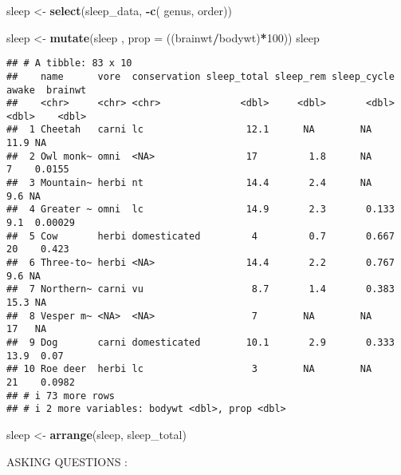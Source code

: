 \documentclass[
]{article}
\newenvironment{Shaded}{\begin{snugshade}}{\end{snugshade}}
\newcommand{\AttributeTok}[1]{\textcolor[rgb]{0.13,0.29,0.53}{#1}}
\newcommand{\DecValTok}[1]{\textcolor[rgb]{0.00,0.00,0.81}{#1}}
\newcommand{\FunctionTok}[1]{\textcolor[rgb]{0.13,0.29,0.53}{\textbf{#1}}}
\newcommand{\NormalTok}[1]{#1}
\newcommand{\OtherTok}[1]{\textcolor[rgb]{0.56,0.35,0.01}{#1}}
\newcommand{\SpecialCharTok}[1]{\textcolor[rgb]{0.81,0.36,0.00}{\textbf{#1}}}
\begin{document}
\begin{Shaded}
\begin{Highlighting}[]
\NormalTok{sleep }\OtherTok{\textless{}{-}} \FunctionTok{select}\NormalTok{(sleep\_data, }\SpecialCharTok{{-}}\FunctionTok{c}\NormalTok{( genus, order))}
\end{Highlighting}
\end{Shaded}

\begin{Shaded}
\begin{Highlighting}[]
\NormalTok{sleep }\OtherTok{\textless{}{-}} \FunctionTok{mutate}\NormalTok{(sleep , }\AttributeTok{prop =}\NormalTok{ ((brainwt}\SpecialCharTok{/}\NormalTok{bodywt)}\SpecialCharTok{*}\DecValTok{100}\NormalTok{))}
\NormalTok{sleep}
\end{Highlighting}
\end{Shaded}

\begin{verbatim}
## # A tibble: 83 x 10
##    name      vore  conservation sleep_total sleep_rem sleep_cycle awake  brainwt
##    <chr>     <chr> <chr>              <dbl>     <dbl>       <dbl> <dbl>    <dbl>
##  1 Cheetah   carni lc                  12.1      NA        NA      11.9 NA      
##  2 Owl monk~ omni  <NA>                17         1.8      NA       7    0.0155 
##  3 Mountain~ herbi nt                  14.4       2.4      NA       9.6 NA      
##  4 Greater ~ omni  lc                  14.9       2.3       0.133   9.1  0.00029
##  5 Cow       herbi domesticated         4         0.7       0.667  20    0.423  
##  6 Three-to~ herbi <NA>                14.4       2.2       0.767   9.6 NA      
##  7 Northern~ carni vu                   8.7       1.4       0.383  15.3 NA      
##  8 Vesper m~ <NA>  <NA>                 7        NA        NA      17   NA      
##  9 Dog       carni domesticated        10.1       2.9       0.333  13.9  0.07   
## 10 Roe deer  herbi lc                   3        NA        NA      21    0.0982 
## # i 73 more rows
## # i 2 more variables: bodywt <dbl>, prop <dbl>
\end{verbatim}

\begin{Shaded}
\begin{Highlighting}[]
\NormalTok{sleep }\OtherTok{\textless{}{-}} \FunctionTok{arrange}\NormalTok{(sleep, sleep\_total)}
\end{Highlighting}
\end{Shaded}

ASKING QUESTIONS :
\end{document}
